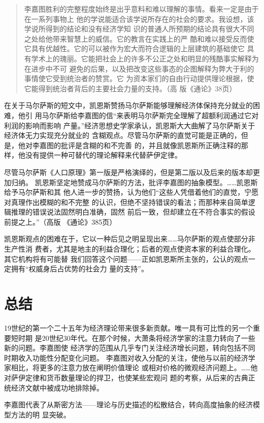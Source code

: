 \begin{quotation}
李嘉图胜利的完整程度始终是出乎意料和难以理解的事情。看来一定是由于在一系列事物上
他的学说能适合该学说所存在的社会的要求。我设想，该学说所得到的结论和没有经济学知
识的普通人所预期的结论具有很大不同之处给他带来智慧上的威信。它的教言在实践上的严
酷和难以接受反而使它具有优越性。它的可以被作为宏大而符合逻辑的上层建筑的基础使它
具有学术上的瑰丽。它能把社会上的许多不公正之处和明显的残酷事实解释为在进步中不可
避免的后果，以及把改变这些事态的企图解释为弊大于利的事情使它受到统治者的赞赏。它
为资本家们的自由行动提供理论根据，使它能得到统治者背后的主要社会力量的支持。（高
版《通论》38页）
\end{quotation}

在关于马尔萨斯的短文中，凯恩斯赞扬马尔萨斯能够理解经济体保持充分就业的困难，他引
用马尔萨斯给李嘉图的信“来表明马尔萨斯完全理解了超额利润通过它对利润的影响而影响
产量。”经济思想史学家承认，凯恩斯大大曲解了马尔萨斯关于经济体无力实现充分就业的
含糊观点。尽管马尔萨斯的直觉可能是正确的，但是，他对李嘉图的批评是含糊的和不完善
的，并且就像凯恩斯所正确注释的那样，他没有提供一种可替代的理论解释来代替萨伊定律。

尽管马尔萨斯《人口原理》第一版是严格演绎的，但是第二版以及后来的版本却更加归纳。
凯恩斯坚定地赞成马尔萨斯的方法，批评李嘉图的抽象模型。……凯恩斯给予马尔萨斯和其
他人进一步的赞扬，认为他们“这些人凭借着他们的直觉，宁愿对真理作出模糊的和不完整
的认识，但绝不坚持错误的看法；而那种来自简单逻辑推理的错误说法固然明白准确，固然
前后一致，但却建立在不符合事实的假设前提之上。”（高版 《通论》385页）

凯恩斯观点的困难在于，它以一种后见之明呈现出来……马尔萨斯的观点使部分非生产性消
费者，尤其是地主的利益合理化；后者的观点使资本家的利益合理化。其它机构将有可能替
我们回答这个问题——正如凯恩斯所主张的，公认的观点一定拥有“权威身后占优势的社会力
量的支持”。

\section{总结}

19世纪的第一个二十五年为经济理论带来很多新贡献。唯一具有可比性的另一个重要短时期
是20世纪30年代。在那个时候，大萧条将经济学家的注意力转向了一些新的问题。李嘉图使
经济学的范围从几乎专门关注经济增长问题，转向包括不同时期收入功能性分配变化问题。
李嘉图对收入分配的关注，使他与以前的经济学家相比，将更多的注意力放在阐明价值理论
或相对价格的微观经济问题上。……他对萨伊定律和货币数量理论的捍卫，也使某些宏观问
题的考察，从后来的古典正统经济文献中被成功地排除掉。

李嘉图代表了从斯密方法——理论与历史描述的松散结合，转向高度抽象的经济模型方法的明
显突破。


